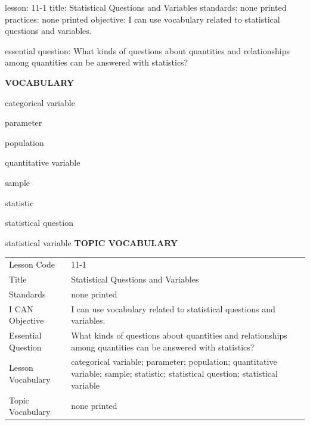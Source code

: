 \documentclass{article}
\newenvironment{lesson-meta}{}{}        %
\newcommand{\te}[1]{}                   %
\begin{document}
\begin{lesson-meta}
lesson: 11-1
title: Statistical Questions and Variables
standards: none printed
practices: none printed
objective: I can use vocabulary related to statistical questions and variables.

essential question: What kinds of questions about quantities and relationships among quantities can be answered with statistics?

\textbf{VOCABULARY}
\item categorical variable
\item parameter
\item population
\item quantitative variable
\item sample
\item statistic
\item statistical question
\item statistical variable
\textbf{TOPIC VOCABULARY}
\te{No separate topic vocabulary list is printed on these pages.}
\begin{tabular}{ll}
Lesson Code & 11-1 \\
Title & Statistical Questions and Variables \\
Standards & none printed \\
I CAN Objective & I can use vocabulary related to statistical questions and variables. \\
Essential Question & What kinds of questions about quantities and relationships among quantities can be answered with statistics? \\
Lesson Vocabulary & categorical variable; parameter; population; quantitative variable; sample; statistic; statistical question; statistical variable \\
Topic Vocabulary & none printed \\
\end{tabular}
\end{lesson-meta}
\end{document}
